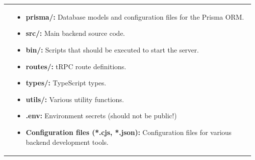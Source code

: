 \documentclass[notitlepage, 12pt]{report}
\begin{document}
\noindent\begin{xltabular}{\textwidth}{
		@{}
		p{0.3\textwidth}
		X
	}
	&
	\begin{itemize}[label={}, leftmargin=5pt]
		\item	\textbf{prisma/:} Database models and configuration files for the Prisma ORM.
		\item	\textbf{src/:} Main backend source code.
		\item	\textbf{bin/:} Scripts that should be executed to start the server.
		\item	\textbf{routes/:} tRPC route definitions.
		\item	\textbf{types/:} TypeScript types.
		\item	\textbf{utils/:} Various utility functions.
		\item	\textbf{.env:} Environment secrets (should not be public!)
		\item	\textbf{Configuration files (*.cjs, *.json):} Configuration files for various backend development tools.
	\end{itemize}
\end{xltabular}
\end{document}
